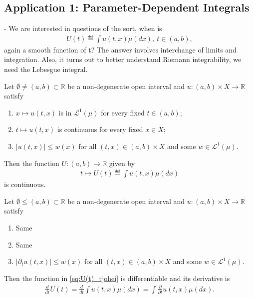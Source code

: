 \subsection*{Application 1: Parameter-Dependent Integrals}
- We are interested in questions of the sort, when is 
\begin{align*}
    U(t) \eqdef \int u(t,x)\mu(dx), \ t\in(a,b),
\end{align*}
again a smooth function of t? The answer involves interchange of limits and integration. Also, it turns out to better understand Riemann
integrability, we need the Lebesgue integral.
\begin{theorem}
    Let \(\emptyset \neq(a,b)\subset\mathbb{R}\) be a non-degenerate open interval and \(u:(a,b)\times X \rightarrow\mathbb{R}\) satisfy
    \begin{enumerate}[label=(\alph*)]
        \item \(x\mapsto u(t,x)\) is in \(\mathcal{L}^{1}(\mu)\) for every fixed \(t\in(a,b)\);
        \item \(t\mapsto u(t,x)\) is continuous for every fixed \(x\in X\);
        \item \(\vert u(t,x)\vert \leq w(x)\) for all \((t,x)\in (a,b)\times X\) and some \(w\in\mathcal{L}^{1}(\mu)\).
    \end{enumerate}
    Then the function \(U:(a,b)\rightarrow\mathbb{R}\) given by
    \begin{align} \label{eq:U(t)_tjohei}
        t\mapsto U(t)\eqdef \int u(t,x)\mu(dx)
    \end{align}
    is continuous.
\end{theorem}
\begin{theorem}
    Let \(\emptyset\leq(a,b)\subset\mathbb{R}\) be a non-degenerate open interval and \(u:(a,b)\times X\rightarrow\mathbb{R}\) satisfy
    \begin{enumerate}[label=(\alph*)]
        \item Same
        \item Same 
        \item \(\vert\partial_t u(t,x)\vert \leq w(x)\) for all \((t,x)\in(a,b)\times X\) and some \(w\in\mathcal{L}^{1}(\mu)\).
    \end{enumerate}
    Then the function in \ref{eq:U(t)_tjohei} is differentiable and its derivative is
    \begin{align}
        \frac{d}{dt}U(t) = \frac{d}{dt}\int u(t,x)\mu(dx) = \int \frac{\partial}{\partial t}u(t,x)\mu(dx).
    \end{align}
\end{theorem}
\fi


